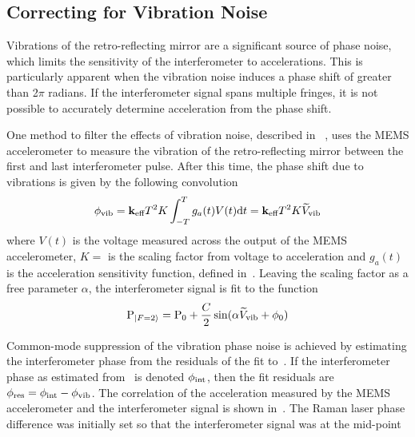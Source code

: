 \subsection{Correcting for Vibration
Noise}\label{subsec:vibration_sensitivity}
Vibrations of the retro-reflecting mirror are a significant source of
phase noise, which limits the sensitivity of the interferometer to
accelerations. This is particularly apparent when the vibration noise
induces a phase shift of greater than 2\(\pi\) radians. If the
interferometer signal spans multiple fringes, it is not possible to
accurately determine acceleration from the phase shift.
\par\noindent
One method to filter the effects of vibration noise, described in
~\cite{Merlet2009}, uses the MEMS accelerometer to measure the
vibration of the retro-reflecting mirror between the
first and last interferometer pulse. After this time, the phase shift
due to vibrations is given by the following convolution
\begin{equation}
  \phi_\textnormal{vib} =  {\textbf k_\textnormal{eff}} T^2 K\int_{-T}^{T} g_a (t) V(t)
  \mathrm{d}t = {\textbf k_\textnormal{eff}} T^2 K
  \widetilde{V}_\textnormal{vib}
  \label{eq:phase_vib}
\end{equation}
where \(V(t)\) is the voltage measured across the output of the MEMS
accelerometer, \(K = \)  is the
scaling factor from voltage to acceleration and \(g_a(t)\) is the
acceleration sensitivity function, defined
in~. Leaving the scaling factor as a
free parameter $\alpha$, the interferometer signal is
fit to the function
\begin{equation}
  \text{P}_{\ket{F=2}} = \text{P}_0 + \frac{C}{2}\sin(\alpha
  \widetilde{V}_\textnormal{vib} + \phi_0)
  \label{eq:fringe_fit_vibration}
\end{equation}
\par\noindent
Common-mode suppression of the vibration phase noise is achieved by
estimating the interferometer phase from the residuals of the fit
to~. If the interferometer phase
as estimated from~ is denoted
\(\phi_\textnormal{int}\), then the fit residuals are
\(\phi_\textnormal{res} =  \phi_\textnormal{int} -
\phi_\textnormal{vib}\).
The correlation of the acceleration measured by the MEMS accelerometer
and the interferometer signal is shown
in~. The Raman laser phase difference was
initially set so that the interferometer signal was at the mid-point
